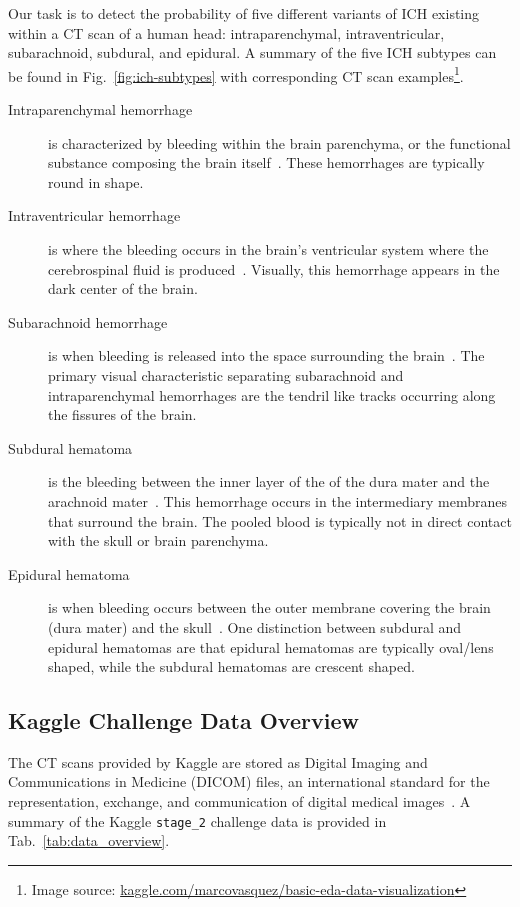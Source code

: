 \documentclass[runningheads]{llncs}
\begin{document}
Our task is to detect the probability of five different variants of ICH existing within a CT scan of a human head: intraparenchymal, intraventricular, subarachnoid, subdural, and epidural.
A summary of the five ICH subtypes can be found in Fig.~\ref{fig:ich-subtypes} with corresponding CT scan examples\footnote{Image source: \href{https://www.kaggle.com/marcovasquez/basic-eda-data-visualization\#1--What-is-an-intracranial-hemorrhage}{kaggle.com/marcovasquez/basic-eda-data-visualization}}.

\begin{description}
    \item [Intraparenchymal hemorrhage] is characterized by bleeding within the brain parenchyma, or the functional substance composing the brain itself~\cite{10.1001/jama.2019.2413}. These hemorrhages are typically round in shape.
    \item [Intraventricular hemorrhage] is where the bleeding occurs in the brain's ventricular system where the cerebrospinal fluid is produced~\cite{PMID:20425231}. Visually, this hemorrhage appears in the dark center of the brain.
    \item [Subarachnoid hemorrhage] is when bleeding is released into the space surrounding the brain~\cite{ABRAHAM2016901}. The primary visual characteristic separating subarachnoid and intraparenchymal hemorrhages are the tendril like tracks occurring along the fissures of the brain.
    \item [Subdural hematoma] is the bleeding between the inner layer of the of the dura mater and the arachnoid mater~\cite{PMID:28558815}. This hemorrhage occurs in the intermediary membranes that surround the brain. The pooled blood is typically not in direct contact with the skull or brain parenchyma.
    \item [Epidural hematoma] is when bleeding occurs between the outer membrane covering the brain (dura mater) and the skull~\cite{ISBN:9780199710041}. One distinction between subdural and epidural hematomas are that epidural hematomas are typically oval/lens shaped, while the subdural hematomas are crescent shaped.
\end{description}

\subsection{Kaggle Challenge Data Overview}

The CT scans provided by Kaggle are stored as Digital Imaging and Communications in Medicine (DICOM) files, an international standard for the representation, exchange, and communication of digital medical images~\cite{mildenberger2002introduction}.
A summary of the Kaggle \texttt{stage\_2} challenge data is provided in Tab.~\ref{tab:data_overview}.
\end{document}
